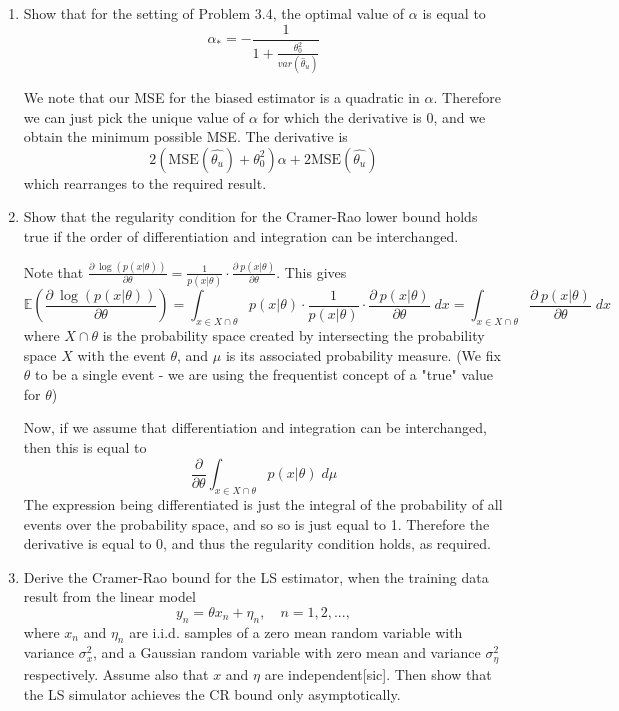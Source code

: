 \documentclass{article}
\newcommand{\chapternumber}{3}
\newenvironment{QandA}{\begin{enumerate}[label=\chapternumber.\arabic*]\bfseries\boldmath}
	{\end{enumerate}}
\newenvironment{answered}{\par\bigskip\normalfont\unboldmath}{}
\begin{document}
\begin{QandA}
\begin{answered}
		\end{answered}
	
		\item Show that for the setting of Problem 3.4, the optimal value of $\alpha$ is equal to 
		\[\alpha_*=-\frac{1}{1+\frac{\theta_0^2}{var(\hat{\theta}_u)}}\]
		\begin{answered}
			We note that our MSE for the biased estimator is a quadratic in $\alpha$. Therefore we can just pick the unique value of $\alpha$ for which the derivative is 0, and we obtain the minimum possible MSE. The derivative is
			\[2(\text{MSE}(\hat{\theta_u})+\theta_0^2)\alpha+2\text{MSE}(\hat{\theta_u})\]
			which rearranges to the required result.
		\end{answered}
	
		\item Show that the regularity condition for the Cramer-Rao lower bound holds true if the order of differentiation and integration can be interchanged.
		\begin{answered}
			Note that $\frac{\partial\:\log (p(x|\theta))}{\partial \theta} = \frac{1}{p(x|\theta)}\cdot\frac{\partial\:p(x|\theta)}{\partial \theta}$. This gives \[\mathbb{E}\left(\frac{\partial\:\log (p(x|\theta))}{\partial \theta}\right)=\int_{x\in X\cap\theta} p(x|\theta)\cdot\frac{1}{p(x|\theta)}\cdot\frac{\partial\:p(x|\theta)}{\partial \theta}\;dx=\int_{x\in X\cap\theta}\frac{\partial\:p(x|\theta)}{\partial \theta}\;dx\]
			where $X\cap\theta$ is the probability space created by intersecting the probability space $X$ with the event $\theta$, and $\mu$ is its associated probability measure. (We fix $\theta$ to be a single event - we are using the frequentist concept of a "true" value for $\theta$)
			
			Now, if we assume that differentiation and integration can be interchanged, then this is equal to
			\[\frac{\partial}{\partial\theta}\int_{x\in X\cap\theta}p(x|\theta)\;d\mu\]
			The expression being differentiated is just the integral of the probability of all events over the probability space, and so so is just equal to 1. Therefore the derivative is equal to 0, and thus the regularity condition holds, as required.
		\end{answered}
	
		\item Derive the Cramer-Rao bound for the LS estimator, when the training data result from the linear model
		\[y_n=\theta x_n+\eta_n,\quad n=1,2,...,\]
		where $x_n$ and $\eta_n$ are i.i.d. samples of a zero mean random variable with variance $\sigma_x^2$, and a Gaussian random variable with zero mean and variance $\sigma_\eta^2$ respectively. Assume also that $x$ and $\eta$ are independent[sic]. Then show that the LS simulator achieves the CR bound only asymptotically.
		

\end{QandA}
\end{document}

